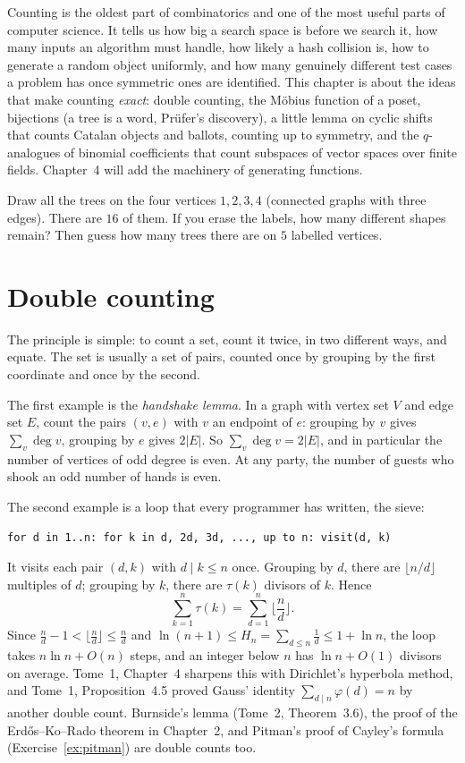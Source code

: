 Counting is the oldest part of combinatorics and one of the most useful parts of computer science. It tells us how big a
search space is before we search it, how many inputs an algorithm must handle, how likely a hash collision is, how to
generate a random object uniformly, and how many genuinely different test cases a problem has once symmetric ones are
identified. This chapter is about the ideas that make counting \emph{exact}: double counting, the M\"obius function of a poset,
bijections (a tree is a word, Pr\"ufer's discovery), a little lemma on cyclic shifts that counts Catalan objects and ballots,
counting up to symmetry, and the $q$-analogues of binomial coefficients that count subspaces of vector spaces over finite
fields. Chapter~4 will add the machinery of generating functions.

\begin{think}
Draw all the trees on the four vertices $1,2,3,4$ (connected graphs with three edges). There are $16$ of them. If you erase
the labels, how many different shapes remain? Then guess how many trees there are on $5$ labelled vertices.
\end{think}

\section{Double counting}

The principle is simple: to count a set, count it twice, in two different ways, and equate. The set is usually a set of
pairs, counted once by grouping by the first coordinate and once by the second.

The first example is the \emph{handshake lemma}. In a graph with vertex set $V$ and edge set $E$, count the pairs $(v,e)$ with
$v$ an endpoint of $e$: grouping by $v$ gives $\sum_v\deg v$, grouping by $e$ gives $2|E|$. So $\sum_v\deg v=2|E|$, and in particular the
number of vertices of odd degree is even. At any party, the number of guests who shook an odd number of hands is even.

The second example is a loop that every programmer has written, the sieve:
\begin{center}
\texttt{for d in 1..n: for k in d, 2d, 3d, ..., up to n: visit(d, k)}
\end{center}
It visits each pair $(d,k)$ with $d\mid k\le n$ once. Grouping by $d$, there are $\lfloor n/d\rfloor$ multiples of $d$; grouping by $k$, there
are $\tau(k)$ divisors of $k$. Hence
\[
\sum_{k=1}^n\tau(k)=\sum_{d=1}^n\Big\lfloor\frac nd\Big\rfloor .
\]
Since $\frac nd-1<\lfloor\frac nd\rfloor\le\frac nd$ and $\ln(n+1)\le H_n=\sum_{d\le n}\frac1d\le1+\ln n$, the loop takes $n\ln n+O(n)$ steps, and an integer below $n$ has
$\ln n+O(1)$ divisors on average. Tome~1, Chapter~4 sharpens this with Dirichlet's hyperbola method, and Tome~1,
Proposition~4.5 proved Gauss' identity $\sum_{d\mid n}\varphi(d)=n$ by another double count. Burnside's lemma (Tome~2,
Theorem~3.6), the proof of the Erd\H os--Ko--Rado theorem in Chapter~2, and Pitman's proof of Cayley's formula
(Exercise~\ref{ex:pitman}) are double counts too.

